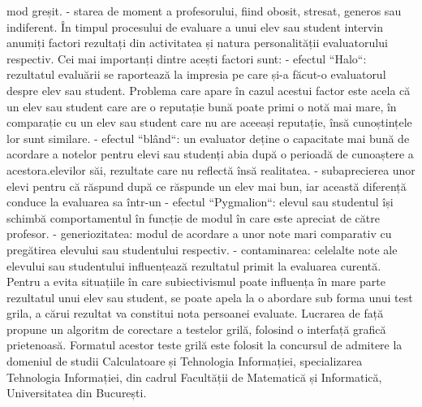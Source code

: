 \documentclass[a4paper,12pt]{report}
\newcommand\tab[1][1cm]{\hspace*{#1}}
\begin{document}
mod greșit.
\newline - starea de moment a profesorului, fiind obosit, stresat, generos sau indiferent.
\newline\tab În timpul procesului de evaluare a unui elev sau student intervin anumiți factori rezultați din activitatea și natura personalității
evaluatorului respectiv. Cei mai importanți dintre acești factori sunt:
\newline - efectul ``Halo``: rezultatul evaluării se raportează la impresia pe care și-a făcut-o evaluatorul despre elev sau student. Problema care
apare în cazul acestui factor este acela că un elev sau student care are o reputație bună poate primi o notă mai mare, în comparație cu un
elev sau student care nu are aceeași reputație, însă cunoștințele lor sunt similare.
\newline - efectul ``blând``: un evaluator deține o capacitate mai bună de acordare a notelor pentru elevi sau studenți abia după o perioadă
de cunoaștere a acestora.elevilor săi, rezultate care nu reflectă însă realitatea.
\newline - subaprecierea unor elevi pentru că răspund după ce răspunde un elev mai bun, iar această diferență conduce la evaluarea sa într-un 
\newline - efectul ``Pygmalion``: elevul sau studentul își schimbă comportamentul în funcție de modul în care este apreciat de către profesor.
\newline - generiozitatea: modul de acordare a unor note mari comparativ cu pregătirea elevului sau studentului respectiv.
\newline - contaminarea: celelalte note ale elevului sau studentului influențează rezultatul primit la evaluarea curentă.
\newline\tab Pentru a evita situațiile în care subiectivismul poate influența în mare parte rezultatul unui elev sau student, se poate apela
la o abordare sub forma unui test grila, a cărui rezultat va constitui nota persoanei evaluate. 
\newline\tab Lucrarea de față propune un algoritm de corectare a testelor grilă, folosind o interfață grafică prietenoasă. Formatul acestor teste grilă este folosit
 la concursul de admitere la domeniul de studii Calculatoare și Tehnologia Informației, specializarea Tehnologia Informației, din cadrul Facultății de Matematică și
Informatică, Universitatea din București. 
\end{document}
